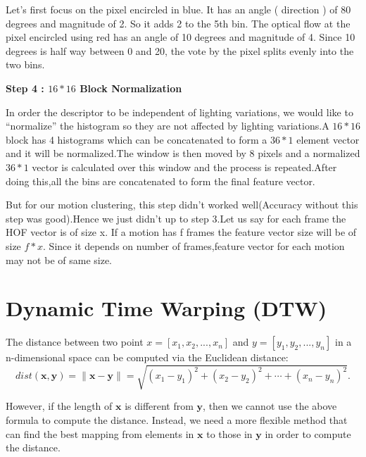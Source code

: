Let’s first focus on the pixel encircled in blue. It has an angle ( direction ) of 80 degrees and magnitude of 2. So it adds 2 to the 5th bin. The optical flow at the pixel encircled using red has an angle of 10 degrees and magnitude of 4. Since 10 degrees is half way between 0 and 20, the vote by the pixel splits evenly into the two bins.

\textbf{Step 4 : \begin{math}16*16\end{math} Block Normalization}

In order the descriptor to be independent of lighting variations, we would like to “normalize” the histogram so they are not affected by lighting variations.A \begin{math}16*16\end{math} block has 4 histograms which can be concatenated to form a \begin{math}36 * 1\end{math} element vector and it will be normalized.The window is then moved by 8 pixels and a normalized \begin{math}36 * 1\end{math} vector is calculated over this window and the process is repeated.After doing this,all the bins are concatenated to form the final feature vector. 

But for our motion clustering, this step didn't worked well(Accuracy without this step was good).Hence we just didn't up to step 3.Let us say for each frame the HOF vector is of size x. If a motion has f frames the feature vector size will be of size $f*x$. Since it depends on number of frames,feature vector for each motion may not be of same size.










\section{Dynamic Time Warping (DTW) }

The distance between two point \({x}=[x_{1}, x_{2}, ..., x_{n}]\) and \({y}=[y_{1}, y_{2}, ..., y_{n}]\) in a n-dimensional space can be computed via the Euclidean distance: 
\[dist(\mathbf{x},\mathbf{y})=\|\mathbf{x}-\mathbf{y}\|=\sqrt{(x_1-y_1)^2+(x_2-y_2)^2+\cdots+(x_n-y_n)^2}.\]

However, if the length of \(\mathbf{x}\) is different from \(\mathbf{y}\), then we cannot use the above formula to compute the distance. Instead, we need a more flexible method that can find the best mapping from elements in \(\mathbf{x}\) to those in \(\mathbf{y}\) in order to compute the distance.

